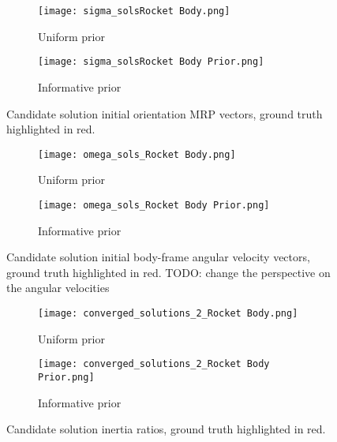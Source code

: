 \documentclass[a4paper,twocolumn]{spaceDebrisC} %
\begin{document}
\begin{figure}[H]
  \centering
  \begin{subfigure}[t]{0.23\textwidth}
    \centering
    \texttt{[image: sigma\_solsRocket Body.png]}
    \caption{Uniform prior}
    \label{fig:sigma_sols1a}
  \end{subfigure}
  \hfill
  \begin{subfigure}[t]{0.23\textwidth}
    \centering
    \texttt{[image: sigma\_solsRocket Body Prior.png]}
    \caption{Informative prior}
    \label{fig:sigma_sols1b}
  \end{subfigure}

  \caption{Candidate solution initial orientation MRP vectors, ground truth highlighted in red.}
  \label{fig:sigma_sols1}
\end{figure}

\begin{figure}[H]
  \centering
  \begin{subfigure}[t]{0.23\textwidth}
    \centering
    \texttt{[image: omega\_sols\_Rocket Body.png]}
    \caption{Uniform prior}
    \label{fig:omega_sols1a}
  \end{subfigure}
  \hfill
  \begin{subfigure}[t]{0.23\textwidth}
    \centering
    \texttt{[image: omega\_sols\_Rocket Body Prior.png]}
    \caption{Informative prior}
    \label{fig:omega_sols1b}
  \end{subfigure}

  \caption{Candidate solution initial body-frame angular velocity vectors, ground truth highlighted in red. TODO: change the perspective on the angular velocities}
  \label{fig:omega_sols1}
\end{figure}

\begin{figure}[H]
  \centering
  \begin{subfigure}[t]{0.23\textwidth}
    \centering
    \texttt{[image: converged\_solutions\_2\_Rocket Body.png]}
    \caption{Uniform prior}
    \label{fig:i_sols1a}
  \end{subfigure}
  \hfill
  \begin{subfigure}[t]{0.23\textwidth}
    \centering
    \texttt{[image: converged\_solutions\_2\_Rocket Body Prior.png]}
    \caption{Informative prior}
    \label{fig:i_sols1b}
  \end{subfigure}

  \caption{Candidate solution inertia ratios, ground truth highlighted in red.}
  \label{fig:i_sols1}
\end{figure}
\end{document}
